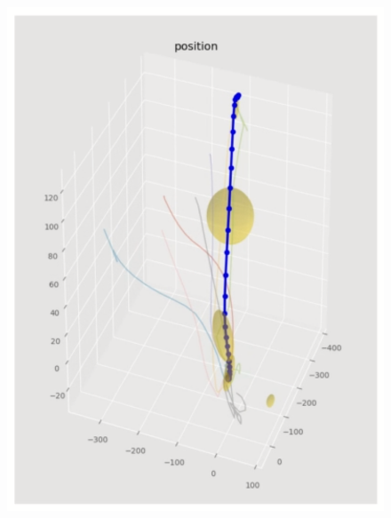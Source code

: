 \begin{figure}[htbp]
\begin{minipage}{0.60\hsize}
\begin{center}
\begin{minipage}{0.45\hsize}
\begin{center}
          \includegraphics[clip,width=\hsize]{./figs/push_button_repro3.png}
        \end{center}
      \end{minipage}
      \begin{minipage}{0.45\hsize}
        \begin{center}

\end{center}
\end{minipage}
\end{center}
\end{minipage}
\end{figure}

